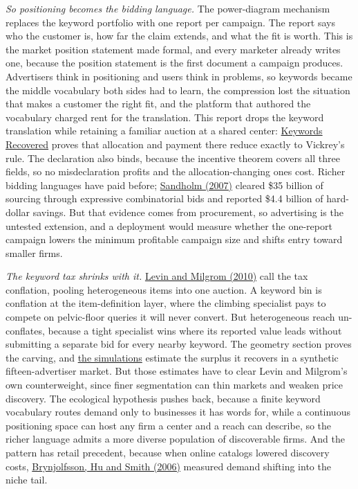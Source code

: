 \emph{So positioning becomes the bidding language.} The power-diagram
mechanism replaces the keyword portfolio with one report per campaign.
The report says who the customer is, how far the claim extends, and what
the fit is worth. This is the market position statement made formal, and
every marketer already writes one, because the position statement is the
first document a campaign produces. Advertisers think in positioning and
users think in problems, so keywords became the middle vocabulary both
sides had to learn, the compression lost the situation that makes a
customer the right fit, and the platform that authored the vocabulary
charged rent for the translation. This report drops the keyword
translation while retaining a familiar auction at a shared center:
\hyperref[keywords-recovered]{Keywords Recovered} proves that allocation
and payment there reduce exactly to Vickrey's rule. The declaration also
binds, because the incentive theorem covers all three fields, so no
misdeclaration profits and the allocation-changing ones cost. Richer
bidding languages have paid before;
\href{https://ojs.aaai.org/aimagazine/index.php/aimagazine/article/view/2054}{Sandholm
(2007)} cleared \$35 billion of sourcing through expressive
combinatorial bids and reported \$4.4 billion of hard-dollar savings.
But that evidence comes from procurement, so advertising is the untested
extension, and a deployment would measure whether the one-report
campaign lowers the minimum profitable campaign size and shifts entry
toward smaller firms.

\emph{The keyword tax shrinks with it.}
\href{https://web.stanford.edu/~jdlevin/Papers/OnlineAds.pdf}{Levin and
Milgrom (2010)} call the tax conflation, pooling heterogeneous items
into one auction. A keyword bin is conflation at the item-definition
layer, where the climbing specialist pays to compete on pelvic-floor
queries it will never convert. But heterogeneous reach un-conflates,
because a tight specialist wins where its reported value leads without
submitting a separate bid for every nearby keyword. The geometry section
proves the carving, and \hyperref[simulations]{the simulations} estimate
the surplus it recovers in a synthetic fifteen-advertiser market. But
those estimates have to clear Levin and Milgrom's own counterweight,
since finer segmentation can thin markets and weaken price discovery.
The ecological hypothesis pushes back, because a finite keyword
vocabulary routes demand only to businesses it has words for, while a
continuous positioning space can host any firm a center and a reach can
describe, so the richer language admits a more diverse population of
discoverable firms. And the pattern has retail precedent, because when
online catalogs lowered discovery costs,
\href{https://sloanreview.mit.edu/article/from-niches-to-riches-anatomy-of-the-long-tail/}{Brynjolfsson,
Hu and Smith (2006)} measured demand shifting into the niche tail.

